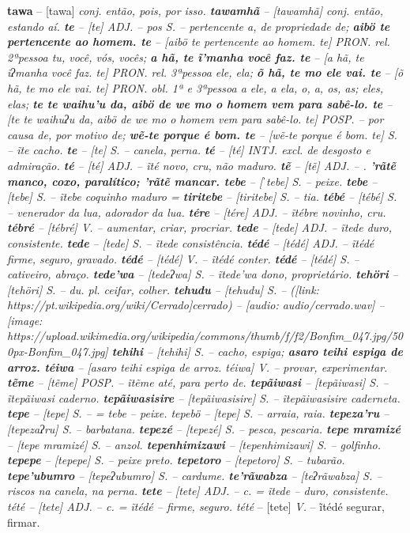 \textbf{tawa} -- [tawa] \textit{conj. então, pois, por isso.
\textbf{tawamhã} -- [tawamhã] \textit{conj. então, estando aí.
\textbf{te} -- [te] \textit{ADJ.} -- pos S.} -- pertencente a, de propriedade de;
\textbf{aibö te pertencente ao homem. te} -- [aibö te pertencente ao homem. te] \textit{PRON. rel. 2ªpessoa tu, você, vós, vocês;
\textbf{a hã, te ĩ'manha você faz. te} -- [a hã, te ĩʔmanha você faz. te] \textit{PRON. rel. 3ªpessoa ele, ela;
\textbf{õ hã, te mo ele vai. te} -- [õ hã, te mo ele vai. te] \textit{PRON. obl. 1ª e 3ªpessoa a ele, a ela, o, a, os, as; eles, elas;
\textbf{te te waihu'u da, aibö de we mo o homem vem para sabê-lo. te} -- [te te waihuʔu da, aibö de we mo o homem vem para sabê-lo. te] \textit{POSP.} -- por causa de, por motivo de;
\textbf{wẽ-te porque é bom. te} -- [wẽ-te porque é bom. te] \textit{S.} -- ĩte cacho.
\textbf{te} -- [te] \textit{S.} -- canela, perna.
\textbf{té} -- [té] \textit{INTJ. excl. de desgosto e admiração.
\textbf{té} -- [té] \textit{ADJ.} -- ĩté novo, cru, não maduro.
\textbf{tẽ} -- [tẽ] \textit{ADJ.} -- .
\textbf{'rãtẽ manco, coxo, paralítico; 'rãtẽ mancar. tebe} -- [ˈtebe] \textit{S.} -- peixe.
\textbf{tebe} -- [tebe] \textit{S.} -- ĩtebe coquinho maduro =
\textbf{tiritebe} -- [tiritebe] \textit{S.} -- tia.
\textbf{tébé} -- [tébé] \textit{S.} -- venerador da lua, adorador da lua.
\textbf{tére} -- [tére] \textit{ADJ.} -- ĩtébre novinho, cru.
\textbf{tébré} -- [tébré] \textit{V.} -- aumentar, criar, procriar.
\textbf{tede} -- [tede] \textit{ADJ.} -- ĩtede duro, consistente.
\textbf{tede} -- [tede] \textit{S.} -- ĩtede consistência.
\textbf{tédé} -- [tédé] \textit{ADJ.} -- ĩtédé firme, seguro, gravado.
\textbf{tédé} -- [tédé] \textit{V.} -- ĩtédé conter.
\textbf{tédé} -- [tédé] \textit{S.} -- cativeiro, abraço.
\textbf{tede'wa} -- [tedeʔwa] \textit{S.} -- ĩtede'wa dono, proprietário.
\textbf{tehöri} -- [tehöri] \textit{S.} -- du. pl. ceifar, colher.
\textbf{tehudu} -- [tehudu] \textit{S.} -- ([link: https://pt.wikipedia.org/wiki/Cerrado]cerrado)} -- [audio: audio/cerrado.wav]} -- [image: https://upload.wikimedia.org/wikipedia/commons/thumb/f/f2/Bonfim_047.jpg/500px-Bonfim_047.jpg]
\textbf{tehihi} -- [tehihi] \textit{S.} -- cacho, espiga;
\textbf{asaro teihi espiga de arroz. téiwa} -- [asaro teihi espiga de arroz. téiwa] \textit{V.} -- provar, experimentar.
\textbf{tẽme} -- [tẽme] \textit{POSP.} -- ĩtẽme até, para perto de.
\textbf{tepãiwasi} -- [tepãiwasi] \textit{S.} -- ĩtepãiwasi caderno.
\textbf{tepãiwasisire} -- [tepãiwasisire] \textit{S.} -- ĩtepãiwasisire caderneta.
\textbf{tepe} -- [tepe] \textit{S.} -- = tebe -- peixe. tepebö} -- [tepe] \textit{S.} -- arraia, raia.
\textbf{tepeza'ru} -- [tepezaʔru] \textit{S.} -- barbatana.
\textbf{tepezé} -- [tepezé] \textit{S.} -- pesca, pescaria.
\textbf{tepe mramizé} -- [tepe mramizé] \textit{S.} -- anzol.
\textbf{tepenhimizawi} -- [tepenhimizawi] \textit{S.} -- golfinho.
\textbf{tepepe} -- [tepepe] \textit{S.} -- peixe preto.
\textbf{tepetoro} -- [tepetoro] \textit{S.} -- tubarão.
\textbf{tepe'ubumro} -- [tepeʔubumro] \textit{S.} -- cardume.
\textbf{te'rãwabza} -- [teʔrãwabza] \textit{S.} -- riscos na canela, na perna.
\textbf{tete} -- [tete] \textit{ADJ.} -- c. = ĩtede -- duro, consistente. tété} -- [tete] \textit{ADJ.} -- c. = ĩtédé -- firme, seguro. tété} -- [tete] \textit{V.} -- ĩtédé segurar, firmar.
